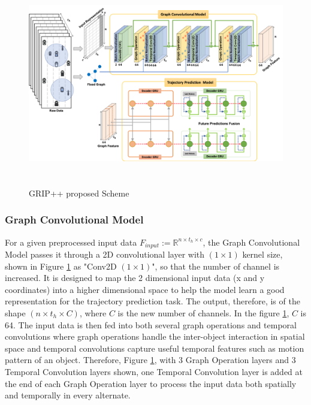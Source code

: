 \begin{figure}[h]
  \begin{center}
     \includegraphics[height=90mm]{Images/Figures/figure1.png}
  \end{center}
  \caption{GRIP++ proposed Scheme}
  \label{fig:gripscheme}
\end{figure}

\subsubsection{Graph Convolutional Model}

\tab For a given preprocessed input data \(F_{input} := \mathbb{R}^{n \times t_h \times c}\), the Graph Convolutional Model passes it through a 2D convolutional layer with \((1 \times 1)\) kernel size, shown in Figure \ref{fig:gripscheme} as "Conv2D \((1 \times 1)\)", so that the number of channel is increased. It is designed to map the 2 dimensional input data (x and y coordinates) into a higher dimensional space to help the model learn a good representation for the trajectory prediction task. The output, therefore, is of the shape \((n \times t_h \times C)\), where \(C\) is the new number of channels. In the figure \ref{fig:gripscheme}, \(C\) is 64. The input data is then fed into both several graph operations and temporal convolutions where graph operations handle the inter-object interaction in spatial space and temporal convolutions capture useful temporal features such as motion pattern of an object. Therefore, Figure \ref{fig:gripscheme}, with 3 Graph Operation layers and 3 Temporal Convolution layers shown, one Temporal Convolution layer is added at the end of each Graph Operation layer to process the input data both spatially and temporally in every alternate. 

